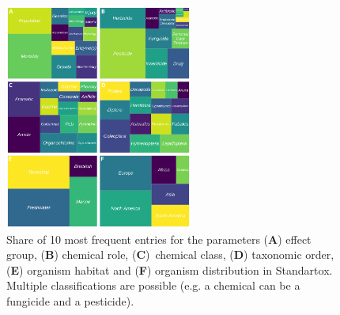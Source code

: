 \documentclass[data,datadescriptor,accept,moreauthors,pdftex]{Definitions/mdpi}
\begin{document}
\begin{figure}[H]
    \centering
    \includegraphics[width=0.55\textwidth]{figures/standartox_parameters.png}
    \caption{Share of 10 most frequent entries for the parameters (\textbf{A}) effect group, (\textbf{B}) chemical role, (\textbf{C})~chemical class, (\textbf{D}) taxonomic order, (\textbf{E}) organism habitat and (\textbf{F}) organism distribution in Standartox. Multiple classifications are possible (e.g. a chemical can be a fungicide and a pesticide).}
    \label{fig:stx-parameters}
\end{figure}
\unskip
\end{document}
